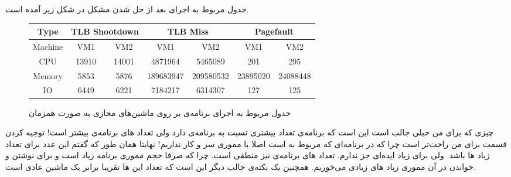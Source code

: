 جدول مربوط به اجرای
بعد از حل شدن مشکل
در شکل زیر آمده است.
\begin{figure}[H]
    \begin{latin}
        \centering
        \begin{tabular}{|c|cccccc|}
        \hline
        Type & \multicolumn{2}{c}{TLB Shootdown} & \multicolumn{2}{c}{TLB Miss} & \multicolumn{2}{c|}{Pagefault}\\
        \hline
        Machine & VM1 & VM2 & VM1 & VM2 & VM1 & VM2\\
        \hline
        CPU & 13910 & 14001 & 4871964 & 5465089 & 201 & 295\\
        \hline
        Memory & 5853 & 5876 & 189683947 & 209580532 & 23895020 & 24088448\\
        \hline
        IO & 6449 & 6221 & 7184217 & 6314307 & 127 & 125\\
        \hline
        \end{tabular}
    \end{latin}
    \caption{جدول مربوط به اجرای برنامه‌ی  بر روی ماشین‌های مجازی به صورت همزمان}
\end{figure}
چیزی که برای من خیلی جالب است این است که برنامه‌ی
تعداد
بیشتری نسبت به برنامه‌ی
دارد ولی تعداد
های
برنامه‌ی
بیشتر است! توجیه کردن قسمت
برای من راحت‌تر است چرا که در برنامه‌ای که مربوط به
است اصلا با مموری سر و کار نداریم! نهایتا همان طور که گفتم این عدد برای تعداد زیاد
ها
باشد. ولی برای
زیاد ایده‌ای جز
ندارم. تعداد
های
برنامه‌ی
نیز منطقی است. چرا که صرفا حجم مموری برنامه زیاد است و برای نوشتن و خواندن در آن مموری زیاد
های
زیادی می‌خوریم. همچنین یک نکته‌ی جالب دیگر این است که تعداد این
ها
تقریبا برابر یک ماشین عادی است.